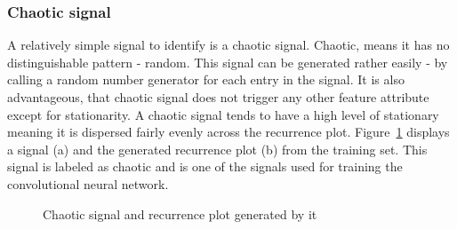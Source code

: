 \documentclass[a4paper,12pt,fleqn]{article}
\begin{document}
\subsubsection{Chaotic signal}
A relatively simple signal to identify is a chaotic signal.
Chaotic, means it has no distinguishable pattern - random.
This signal can be generated rather easily - by calling a random number generator for each entry in the signal.
It is also advantageous, that chaotic signal does not trigger any other feature attribute except for stationarity.
A chaotic signal tends to have a high level of stationary meaning it is dispersed fairly evenly across the recurrence plot.
Figure~\ref{fig:generated_chaotic} displays a signal (a) and the generated recurrence plot (b) from the training set.
This signal is labeled as chaotic and is one of the signals used for training the convolutional neural network.


\begin{figure}
  \centering
  \qquad
  \caption{Chaotic signal and recurrence plot generated by it}
  \label{fig:generated_chaotic}
\end{figure}


\end{document}

